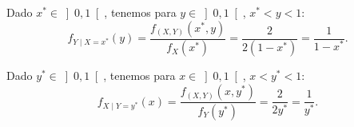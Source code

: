 \begin{ejercicio}
\begin{enumerate}
        Dado $x^\ast\in \left]0,1\right[$, tenemos para $y\in \left]0,1\right[$, $x^\ast<y<1$:
        \begin{equation*}
            f_{Y\mid X=x^\ast} (y) = \dfrac{f_{(X,Y)}(x^\ast, y)}{f_X(x^\ast)} = \dfrac{2}{2(1-x^\ast)} = \dfrac{1}{1-x^\ast}.
        \end{equation*}

        Dado $y^\ast\in \left]0,1\right[$, tenemos para $x\in \left]0,1\right[$, $x<y^\ast<1$:
        \begin{equation*}
            f_{X\mid Y=y^\ast} (x) = \dfrac{f_{(X,Y)}(x, y^\ast)}{f_Y(y^\ast)} = \dfrac{2}{2y^\ast} = \dfrac{1}{y^\ast}.
        \end{equation*}
    \end{enumerate}
\end{ejercicio}

